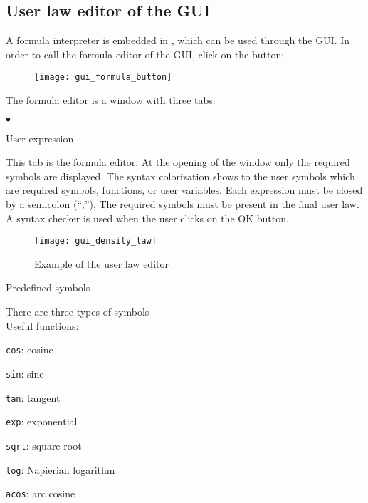 {{{%
\subsection{User law editor of the GUI}

A formula interpreter is embedded in \CS, which can be used through the GUI.
In order to call the formula editor of the GUI, click on the button:

\begin{figure}[!ht]
\begin{center}
\texttt{[image: gui\_formula\_button]}
\label{fig:mei_button}
\end{center}
\end{figure}

The formula editor is a window with three tabs:
\begin{list}{$\bullet$}{}
\item User expression

This tab is the formula editor. At the opening of the
window only the required symbols are displayed.
The syntax colorization shows to the user symbols which are
required symbols, functions, or user variables.
Each expression must be closed by a semicolon (``;''). The
required symbols must be present in the final user law. A
syntax checker is used when the user clicks on the OK button.

\begin{figure}[!ht]
\begin{center}
\texttt{[image: gui\_density\_law]}
\caption{Example of the user law editor}
\label{fig:mei_editor}
\end{center}
\end{figure}

\item Predefined symbols

There are three types of symbols \\

\underline{Useful functions:}

\texttt{cos}: cosine

\texttt{sin}: sine

\texttt{tan}: tangent

\texttt{exp}: exponential

\texttt{sqrt}: square root

\texttt{log}: Napierian logarithm

\texttt{acos}: arc cosine


\end{list}}}}

